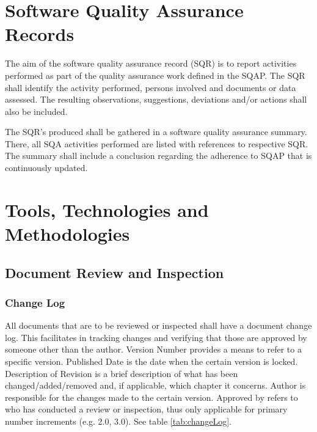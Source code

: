 \documentclass{article}
\begin{document}
	\clearpage
	
	\section{Software Quality Assurance Records} \label{doc}
	The aim of the software quality assurance record (SQR) is to report activities performed as part of the quality assurance work defined in the SQAP. The SQR shall identify the activity performed, persons involved and documents or data assessed. The resulting observations, suggestions, deviations and/or actions shall also be included. 
	
	The SQR's produced shall be gathered in a software quality assurance summary. There, all SQA activities performed are listed with references to respective SQR. The summary shall include a conclusion regarding the adherence to SQAP that is continuously updated.
	
	
	\clearpage
	\section{Tools, Technologies and Methodologies} \label{method}
	
	\subsection{Document Review and Inspection}
	
	\subsubsection{Change Log}
	All documents that are to be reviewed or inspected shall have a document change log. This facilitates in tracking changes and verifying that those are approved by someone other than the author. Version Number provides a means to refer to a specific version. Published Date is the date when the certain version is locked. Description of Revision is a brief description of what has been changed/added/removed and, if applicable, which chapter it concerns. Author is responsible for the changes made to the certain version. Approved by refers to who has conducted a review or inspection, thus only applicable for primary number increments (e.g. 2.0, 3.0). See table \ref{tab:changeLog}.
	
	\begin{table}[h]
		\noindent{}
		\caption{Example of Change Log}
		\label{tab:changeLog}
	\end{table}
	
\end{document}
